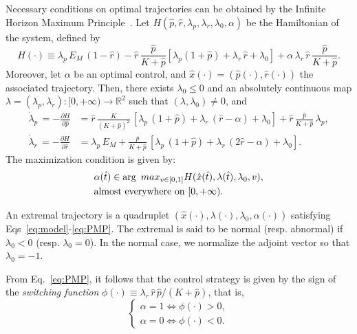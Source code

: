 Necessary conditions on optimal trajectories can be obtained by the Infinite Horizon Maximum Principle~\cite{carlson_infinite_1991}.
Let $H(\hat{p},\hat{r},\lambda_p,\lambda_r,\lambda_0,\alpha)$ be the Hamiltonian of the system, defined by
\[
H(\cdot) \equiv \lambda_p\, E_M\, (1-\hat{r}) - \hat{r}\, \dfrac{\hat{p}}{K+\hat{p}}\left[\lambda_p (1+\hat{p}) +\lambda_r\, \hat{r} +\lambda_0\right] + \alpha \, \lambda_r \, \hat{r}\, \frac{\hat{p}}{K+\hat{p}}.
\]
Moreover, let $\alpha$ be an optimal control, and $\hat{x}(\cdot)=(\hat{p}(\cdot),\hat{r}(\cdot))$ the associated trajectory.
Then, there exists $\lambda_0 \leq 0$ and an absolutely continuous map $\lambda=(\lambda_p,\lambda_r):[0,+\infty) \rightarrow \mathbb{R}^2$
such that $(\lambda,\lambda_0)\neq0$, and
\begin{align}
\dot{\lambda}_p\, =-\frac{\partial H}{\partial \hat p}&= \hat{r} \, \frac{K}{(K+\hat{p})^2}\, \left[\lambda_p \, (1+\hat{p}) +\lambda_r\, ( \hat{r}-\alpha) + \lambda_0\right] + \hat{r}\, \frac{\hat{p}}{K+\hat{p}}\, \lambda_p, \label{eq:adjoint_p}\\
 \dot{\lambda}_r\, =-\frac{\partial H}{\partial \hat r}&= \lambda_p\, E_M +\frac{\hat{p}}{K+\hat{p}} \, \left[\lambda_p \, (1+\hat{p}) +\lambda_r\, (2 \hat{r}-\alpha) +\lambda_0\right] \label{eq:adjoint_r}.
\end{align}
The maximization condition is given by:
\begin{equation}{\label{eq:PMP}}
\begin{aligned}
&\alpha(\hat{t}) \in \arg\ max_{v \in [0,1]} H(\hat{x}(\hat{t}),\lambda(\hat{t}),\lambda_0,v), \\ &\mathrm{almost}\ \mathrm{everywhere}\ \mathrm{on}\ [0,+\infty).
\end{aligned}
\end{equation}

An extremal trajectory is a quadruplet $(\hat{x}(\cdot),\lambda(\cdot),\lambda_0,\alpha(\cdot))$ satisfying \linebreak Eqs~\ref{eq:model}-\ref{eq:PMP}. The extremal is said to be normal (resp. abnormal) if $\lambda_0<0$ (resp. $\lambda_0=0$). In the normal case, we normalize the adjoint vector so that $\lambda_0=-1$.

From Eq.~\ref{eq:PMP}, it follows that the control strategy is given by the sign of the \textit{switching function} $\phi(\cdot) \equiv \lambda_r \, \hat{r}\, \hat{p}/(K+\hat{p})$, that is,
\[
\begin{cases}
\alpha=1 \iff \phi(\cdot) >0,\\
\alpha=0 \iff \phi(\cdot)<0.
\end{cases}
\]

